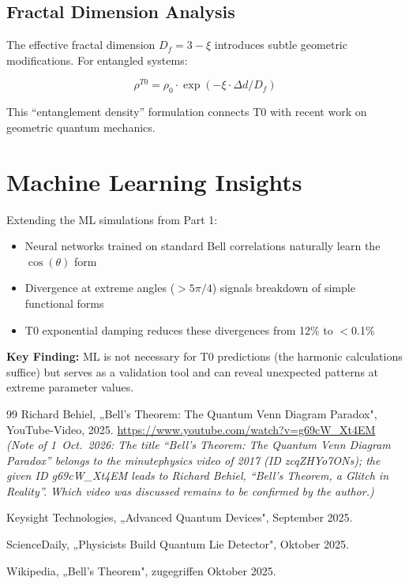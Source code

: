 \subsection{Fractal Dimension Analysis}

The effective fractal dimension $D_f = 3 - \xi$ introduces subtle geometric modifications. For entangled systems:

\begin{equation}
\rho^{T0} = \rho_0 \cdot \exp(-\xi \cdot \Delta d / D_f)
\end{equation}

This ``entanglement density'' formulation connects T0 with recent work on geometric quantum mechanics.

\section{Machine Learning Insights}
\label{sec:ml_extended}

Extending the ML simulations from Part 1:

\begin{itemize}
\item Neural networks trained on standard Bell correlations naturally learn the $\cos(\theta)$ form
\item Divergence at extreme angles ($> 5\pi/4$) signals breakdown of simple functional forms
\item T0 exponential damping reduces these divergences from 12\% to $<$0.1\%
\end{itemize}

\textbf{Key Finding:} ML is not necessary for T0 predictions (the harmonic calculations suffice) but serves as a validation tool and can reveal unexpected patterns at extreme parameter values.
\begin{thebibliography}{99}
	Richard Behiel, „Bell's Theorem: The Quantum Venn Diagram Paradox", 
	YouTube-Video, 2025. 
	\url{https://www.youtube.com/watch?v=g69cW_Xt4EM}\\
	\textit{(Note of 1~Oct.~2026: The title ``Bell's Theorem: The Quantum Venn Diagram Paradox'' belongs to the minutephysics video of 2017 (ID zcqZHYo7ONs); the given ID g69cW\_Xt4EM leads to Richard Behiel, ``Bell's Theorem, a Glitch in Reality''. Which video was discussed remains to be confirmed by the author.)}
	
	Keysight Technologies, „Advanced Quantum Devices", September 2025.
	
	ScienceDaily, „Physicists Build Quantum Lie Detector", Oktober 2025.
	
	Wikipedia, „Bell's Theorem", zugegriffen Oktober 2025.
\end{thebibliography}